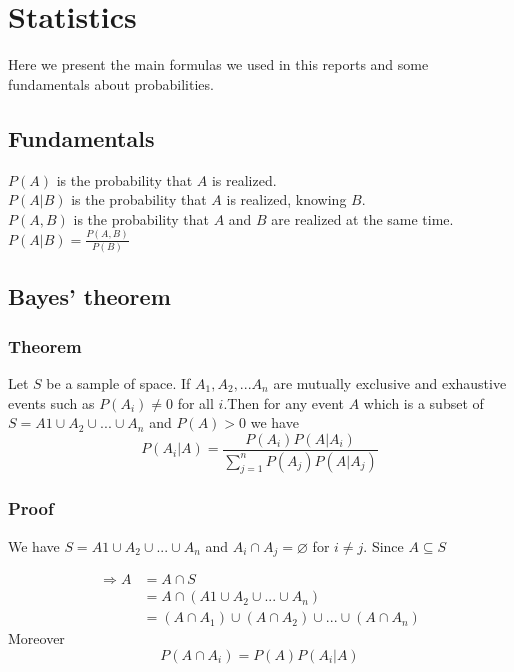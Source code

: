 \chapter{Statistics}\label{app:formulas} Here we present the main formulas we used in this reports and some fundamentals about probabilities.


\section{Fundamentals}\label{f:Fundamentals}

$P(A)$ is the probability that $A$ is realized.\\
$P(A|B)$ is the probability that $A$ is realized, knowing $B$.\\
$P(A,B)$ is the probability that $A$ and $B$ are realized at the same time.\\
$P(A|B) = \frac{P(A,B)}{P(B)}$



\section{Bayes' theorem}\label{f:Bayes}
\subsection{Theorem}
Let $S$ be a sample of space. If $A_1,A_2,...A_n$ are mutually exclusive and exhaustive events such as $P(A_i)\neq 0$ for all $i$.Then for any event $A$ which is a subset of $S = A1\cup A_2 \cup ... \cup A_n$ and $P(A) > 0$ we have
\begin{equation*}
P(A_i|A)= \frac{P(A_i)P(A|A_i)}{\sum_{j=1}^n P(A_j)P(A|A_j)}
\end{equation*}

\subsection{Proof}
We have $S = A1\cup A_2 \cup ... \cup A_n$ and $A_i \cap A_j = \varnothing$ for $i \neq j$. Since $A \subseteq S$

\begin{align*}
\Rightarrow A &= A \cap S\\
              &= A \cap (A1\cup A_2 \cup ... \cup A_n)\\
              &= (A \cap A_1)\cup(A \cap A_2)\cup ... \cup(A \cap A_n)
\end{align*}
Moreover
\begin{equation*}
P(A \cap A_i) = P(A)P(A_i|A)
\end{equation*}

